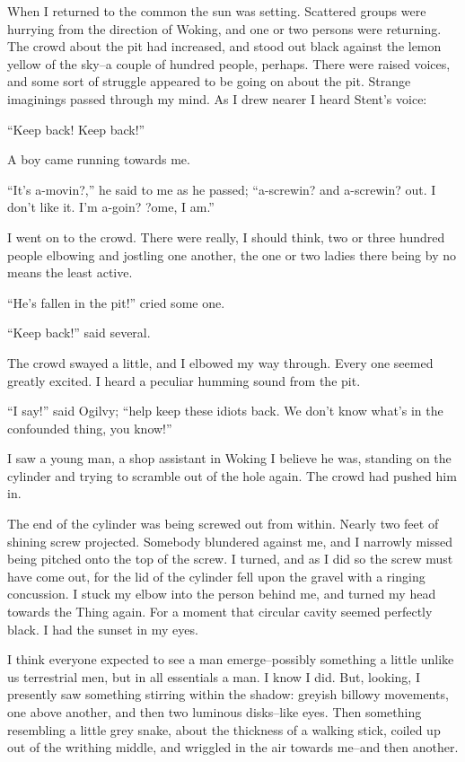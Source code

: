 When I returned to the common the sun was setting. Scattered groups
were hurrying from the direction of Woking, and one or two persons
were returning. The crowd about the pit had increased, and stood
out black against the lemon yellow of the sky--a couple of hundred
people, perhaps. There were raised voices, and some sort of
struggle appeared to be going on about the pit. Strange imaginings
passed through my mind. As I drew nearer I heard Stent's voice:

``Keep back! Keep back!''

A boy came running towards me.

``It's a-movin?,'' he said to me as he passed; ``a-screwin? and
a-screwin? out. I don't like it. I'm a-goin? ?ome, I am.''

I went on to the crowd. There were really, I should think, two or
three hundred people elbowing and jostling one another, the one or
two ladies there being by no means the least active.

``He's fallen in the pit!'' cried some one.

``Keep back!'' said several.

The crowd swayed a little, and I elbowed my way through. Every one
seemed greatly excited. I heard a peculiar humming sound from the
pit.

``I say!'' said Ogilvy; ``help keep these idiots back. We don't know
what's in the confounded thing, you know!''

I saw a young man, a shop assistant in Woking I believe he was,
standing on the cylinder and trying to scramble out of the hole
again. The crowd had pushed him in.

The end of the cylinder was being screwed out from within. Nearly
two feet of shining screw projected. Somebody blundered against me,
and I narrowly missed being pitched onto the top of the screw. I
turned, and as I did so the screw must have come out, for the lid
of the cylinder fell upon the gravel with a ringing concussion. I
stuck my elbow into the person behind me, and turned my head
towards the Thing again. For a moment that circular cavity seemed
perfectly black. I had the sunset in my eyes.

I think everyone expected to see a man emerge--possibly something a
little unlike us terrestrial men, but in all essentials a man. I
know I did. But, looking, I presently saw something stirring within
the shadow: greyish billowy movements, one above another, and then
two luminous disks--like eyes. Then something resembling a little
grey snake, about the thickness of a walking stick, coiled up out
of the writhing middle, and wriggled in the air towards me--and
then another.

